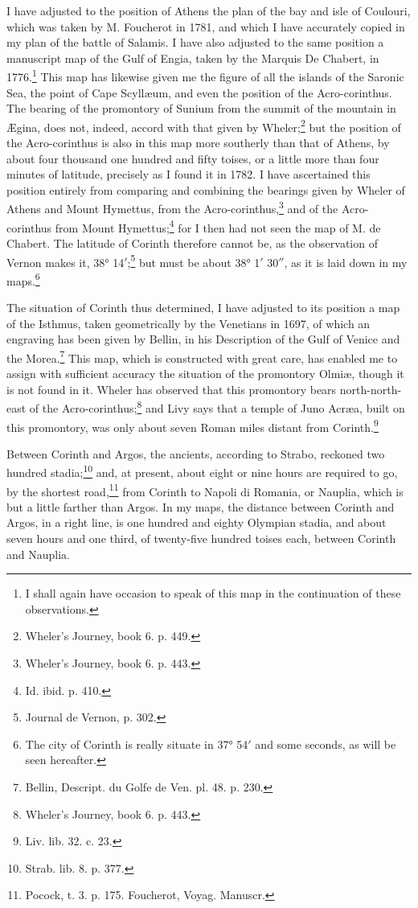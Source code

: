 \documentclass[a4paper, 11pt, oneside, polutonikogreek, english]{article}
\begin{document}
I have adjusted to the position of Athens the plan of the bay and isle of Coulouri, which was taken by M. Foucherot in 1781, and which I have accurately copied in my plan of the battle of Salamis. I have also adjusted to the same position a manuscript map of the Gulf of Engia, taken by the Marquis De Chabert, in 1776.\footnote{I shall again have occasion to speak of this map in the continuation of these observations.} This map has likewise given me the figure of all the islands of the Saronic Sea, the point of Cape Scyllæum, and even the position of the Acro-corinthus. The bearing of the promontory of Sunium from the summit of the mountain in Ægina, does not, indeed, accord with that given by Wheler;\footnote{Wheler's Journey, book 6. p. 449.} but the position of the Acro-corinthus is also in this map more southerly than that of Athens, by about four thousand one hundred and fifty toises, or a little more than four minutes of latitude, precisely as I found it in 1782. I have ascertained this position entirely from comparing and combining the bearings given by Wheler of Athens and Mount Hymettus, from the Acro-corinthus,\footnote{Wheler's Journey, book 6. p. 443.} and of the Acro-corinthus from Mount Hymettus;\footnote{Id. ibid. p. 410.} for I then had not seen the map of M. de Chabert. The latitude of Corinth therefore cannot be, as the observation of Vernon makes it, 38° 14$'$;\footnote{Journal de Vernon, p. 302.} but must be about 38° 1$'$ 30$''$, as it is laid down in my maps.\footnote{The city of Corinth is really situate in 37° 54$'$ and some seconds, as will be seen hereafter.}

The situation of Corinth thus determined, I have adjusted to its position a map of the Isthmus, taken geometrically by the Venetians in 1697, of which an engraving has been given by Bellin, in his Description of the Gulf of Venice and the Morea.\footnote{Bellin, Descript. du Golfe de Ven. pl. 48. p. 230.} This map, which is constructed with great care, has enabled me to assign with sufficient accuracy the situation of the promontory Olmiæ, though it is not found in it. Wheler has observed that this promontory bears north-north-east of the Acro-corinthus;\footnote{Wheler's Journey, book 6. p. 443.} and Livy says that a temple of Juno Acræa, built on this promontory, was only about seven Roman miles distant from Corinth.\footnote{Liv. lib. 32. c. 23.}

Between Corinth and Argos, the ancients, according to Strabo, reckoned two hundred stadia;\footnote{Strab. lib. 8. p. 377.} and, at present, about eight or nine hours are required to go, by the shortest road,\footnote{Pocock, t. 3. p. 175. Foucherot, Voyag. Manuscr.} from Corinth to Napoli di Romania, or Nauplia, which is but a little farther than Argos. In my maps, the distance between Corinth and Argos, in a right line, is one hundred and eighty Olympian stadia, and about seven hours and one third, of twenty-five hundred toises each, between Corinth and Nauplia.
\end{document}
